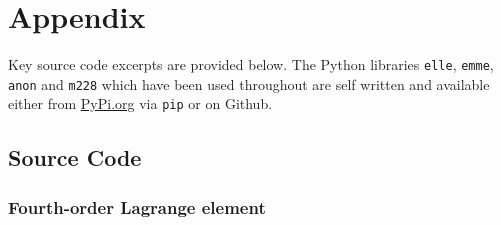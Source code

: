\documentclass[
  11pt,
]{article}
\begin{document}
\newpage{}

\hypertarget{appendix}{%
\section{Appendix}\label{appendix}}

Key source code excerpts are provided below. The Python libraries
\texttt{elle}, \texttt{emme}, \texttt{anon} and \texttt{m228} which have
been used throughout are self written and available either from
\url{PyPi.org} via \texttt{pip} or on Github.

\hypertarget{source-code}{%
\subsection{Source Code}\label{source-code}}

\hypertarget{fourth-order-lagrange-element}{%
\subsubsection{Fourth-order Lagrange
element}\label{fourth-order-lagrange-element}}
\end{document}
